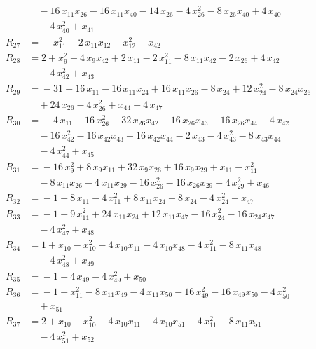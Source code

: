 \begin{align*}
&\quad{} -16\,x_{11} x_{26} -16\,x_{11} x_{40} -14\,x_{26} -4\,x_{26}^{2} -8\,x_{26} x_{40} +4\,x_{40} \\
&\quad{} -4\,x_{40}^{2} +x_{41} \\[2pt]
R_{27} &={} -x_{11}^{2} -2\,x_{11} x_{12} -x_{12}^{2} +x_{42} \\[2pt]
R_{28} &={} 2 +x_{9}^{2} -4\,x_{9} x_{42} +2\,x_{11} -2\,x_{11}^{2} -8\,x_{11} x_{42} -2\,x_{26} +4\,x_{42} \\
&\quad{} -4\,x_{42}^{2} +x_{43} \\[2pt]
R_{29} &={} -31 -16\,x_{11} -16\,x_{11} x_{24} +16\,x_{11} x_{26} -8\,x_{24} +12\,x_{24}^{2} -8\,x_{24} x_{26} \\
&\quad{} +24\,x_{26} -4\,x_{26}^{2} +x_{44} -4\,x_{47} \\[2pt]
R_{30} &={} -4\,x_{11} -16\,x_{26}^{2} -32\,x_{26} x_{42} -16\,x_{26} x_{43} -16\,x_{26} x_{44} -4\,x_{42} \\
&\quad{} -16\,x_{42}^{2} -16\,x_{42} x_{43} -16\,x_{42} x_{44} -2\,x_{43} -4\,x_{43}^{2} -8\,x_{43} x_{44} \\
&\quad{} -4\,x_{44}^{2} +x_{45} \\[2pt]
R_{31} &={} -16\,x_{9}^{2} +8\,x_{9} x_{11} +32\,x_{9} x_{26} +16\,x_{9} x_{29} +x_{11} -x_{11}^{2} \\
&\quad{} -8\,x_{11} x_{26} -4\,x_{11} x_{29} -16\,x_{26}^{2} -16\,x_{26} x_{29} -4\,x_{29}^{2} +x_{46} \\[2pt]
R_{32} &={} -1 -8\,x_{11} -4\,x_{11}^{2} +8\,x_{11} x_{24} +8\,x_{24} -4\,x_{24}^{2} +x_{47} \\[2pt]
R_{33} &={} -1 -9\,x_{11}^{2} +24\,x_{11} x_{24} +12\,x_{11} x_{47} -16\,x_{24}^{2} -16\,x_{24} x_{47} \\
&\quad{} -4\,x_{47}^{2} +x_{48} \\[2pt]
R_{34} &={} 1 +x_{10} -x_{10}^{2} -4\,x_{10} x_{11} -4\,x_{10} x_{48} -4\,x_{11}^{2} -8\,x_{11} x_{48} \\
&\quad{} -4\,x_{48}^{2} +x_{49} \\[2pt]
R_{35} &={} -1 -4\,x_{49} -4\,x_{49}^{2} +x_{50} \\[2pt]
R_{36} &={} -1 -x_{11}^{2} -8\,x_{11} x_{49} -4\,x_{11} x_{50} -16\,x_{49}^{2} -16\,x_{49} x_{50} -4\,x_{50}^{2} \\
&\quad{} +x_{51} \\[2pt]
R_{37} &={} 2 +x_{10} -x_{10}^{2} -4\,x_{10} x_{11} -4\,x_{10} x_{51} -4\,x_{11}^{2} -8\,x_{11} x_{51} \\
&\quad{} -4\,x_{51}^{2} +x_{52} \\[2pt]

\end{align*}
